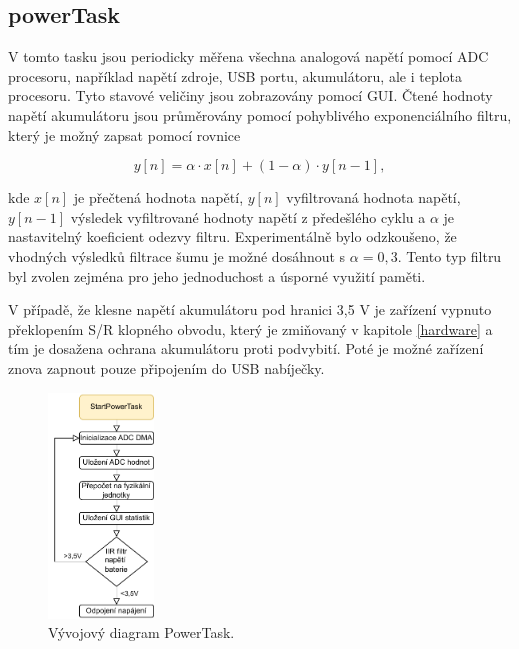\subsection{powerTask}
V tomto tasku jsou periodicky měřena všechna analogová napětí pomocí \ac{ADC} procesoru, například napětí zdroje, USB portu, akumulátoru, ale i teplota procesoru. Tyto stavové veličiny jsou zobrazovány pomocí \ac{GUI}. Čtené hodnoty napětí akumulátoru jsou průměrovány pomocí pohyblivého exponenciálního filtru, který je možný zapsat pomocí rovnice

\begin{equation} \label{eq:EMA}
y[n]=\alpha \cdot x[n] + (1-\alpha)\cdot y[n-1] ,
\end{equation}

kde $ x[n] $ je přečtená hodnota napětí, $ y[n] $ vyfiltrovaná hodnota napětí, $ y[n-1] $ výsledek vyfiltrované hodnoty napětí z předešlého cyklu a $ \alpha $ je nastavitelný koeficient odezvy filtru. Experimentálně bylo odzkoušeno, že vhodných výsledků filtrace šumu je možné dosáhnout s $ \alpha = 0,3$. Tento typ filtru byl zvolen zejména pro jeho jednoduchost a úsporné využití paměti.

V případě, že klesne napětí akumulátoru pod hranici 3,5 V je zařízení vypnuto překlopením S/R klopného obvodu, který je zmiňovaný v kapitole \ref{hardware} a tím je dosažena ochrana akumulátoru proti podvybití. Poté je možné zařízení znova zapnout pouze připojením do USB nabíječky.


\begin{figure}[h]
    \centering
    \includegraphics[width=0.25\textwidth]{obrazky/PowerTask}
    \caption{Vývojový diagram PowerTask.}
\end{figure}
